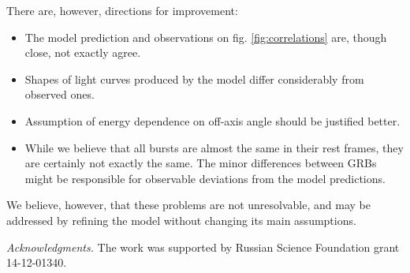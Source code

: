 \documentclass{article}
\begin{document}
	There are, however, directions for improvement:
	\begin{itemize}
		\item{
			The model prediction and observations on fig. \ref{fig:correlations} are, though close, not exactly agree.
		}
		\item{
			Shapes of light curves produced by the model differ considerably from observed ones.
		}
		\item{
			Assumption of energy dependence on off-axis angle should be justified better.
		}
		\item{
			While we believe that all bursts are almost the same in their rest frames, they are certainly not exactly the same.
			The minor differences between GRBs might be responsible for observable deviations from the model predictions.
		}
	\end{itemize}

	We believe, however, that these problems are not unresolvable, and may be addressed by refining the model without changing its main assumptions.

	{\small {\it Acknowledgments.} The work was supported by Russian Science Foundation grant 14-12-01340.}
\end{document}
